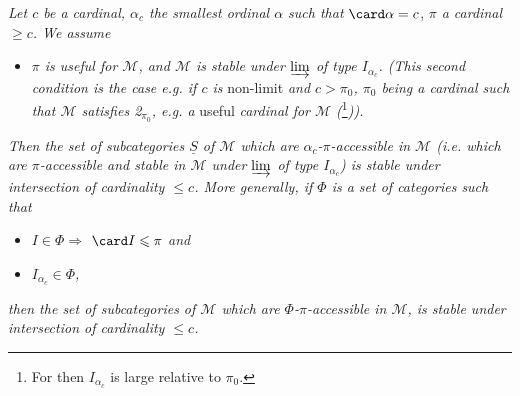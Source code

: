 \textit{Let $c$ be a cardinal, $\alpha_c$ the smallest ordinal $\alpha$ such that} $\card\alpha=c$, \textit{$\pi$ a cardinal $\geqslant c$. We assume}
\begin{itemize}
\item[$(*)$] \textit{$\pi$ is useful for $\mathcal{M}$, and $\mathcal{M}$ is stable under $\varinjlim$ of type $I_{\alpha_c}$. (This second condition is the case e.g. if $c$ is} non-limit \textit{and $c>\pi_0$, $\pi_0$ being a cardinal such that $\mathcal{M}$ satisfies \textit{2}$_{\pi_0}$, e.g. a} useful \textit{cardinal for $\mathcal{M}$ (}\footnote[131]{For then $I_{\alpha_c}$ is large relative to $\pi_0$.}\textit{)).}
\end{itemize}
\textit{Then the set of subcategories $\underline{S}$ of $\mathcal{M}$ which are $\alpha_c$-$\pi$-accessible in $\mathcal{M}$ (i.e. which are $\pi$-accessible and stable in $\mathcal{M}$ under $\varinjlim$ of type $I_{\alpha_c}$) is stable under intersection of cardinality $\leqslant c$. More generally, if $\Phi$ is a set of categories such that} %
\begin{itemize}
\item[\textit{1°)}] \textit{$I\in\Phi\Longrightarrow$} $\card I\leqslant\pi$ \textit{and}
\item[\textit{2°)}] \textit{$I_{\alpha_c}\in\Phi$,}
\end{itemize}
\textit{then the set of subcategories of $\mathcal{M}$ which are $\Phi$-$\pi$-accessible in $\mathcal{M}$, is stable under intersection of cardinality $\leqslant c$.}

